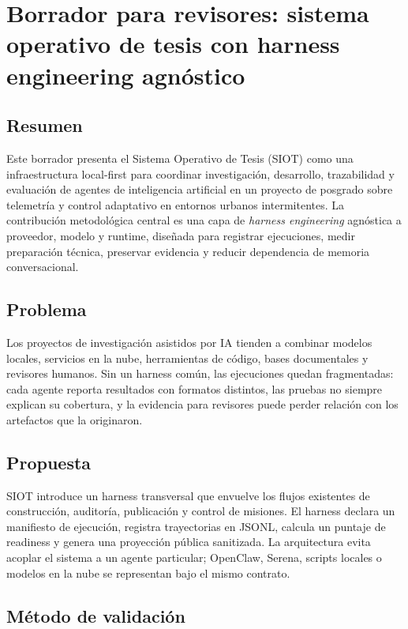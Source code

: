 \chapter{Borrador para revisores: sistema operativo de tesis con harness engineering agnóstico}

\section{Resumen}

Este borrador presenta el Sistema Operativo de Tesis (SIOT) como una infraestructura local-first para coordinar investigación, desarrollo, trazabilidad y evaluación de agentes de inteligencia artificial en un proyecto de posgrado sobre telemetría y control adaptativo en entornos urbanos intermitentes. La contribución metodológica central es una capa de \emph{harness engineering} agnóstica a proveedor, modelo y runtime, diseñada para registrar ejecuciones, medir preparación técnica, preservar evidencia y reducir dependencia de memoria conversacional.

\section{Problema}

Los proyectos de investigación asistidos por IA tienden a combinar modelos locales, servicios en la nube, herramientas de código, bases documentales y revisores humanos. Sin un harness común, las ejecuciones quedan fragmentadas: cada agente reporta resultados con formatos distintos, las pruebas no siempre explican su cobertura, y la evidencia para revisores puede perder relación con los artefactos que la originaron.

\section{Propuesta}

SIOT introduce un harness transversal que envuelve los flujos existentes de construcción, auditoría, publicación y control de misiones. El harness declara un manifiesto de ejecución, registra trayectorias en JSONL, calcula un puntaje de readiness y genera una proyección pública sanitizada. La arquitectura evita acoplar el sistema a un agente particular; OpenClaw, Serena, scripts locales o modelos en la nube se representan bajo el mismo contrato.

\section{Método de validación}

